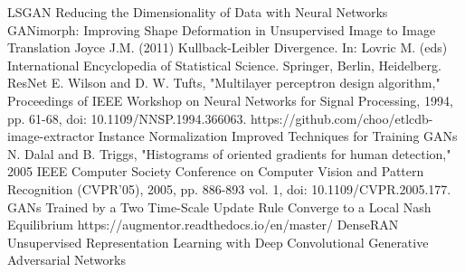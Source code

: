 \documentclass[12pt]{report}
\begin{document}
\begin{thebibliography}{9}
	 LSGAN
	 Reducing the Dimensionality of Data with Neural Networks
	 GANimorph: Improving Shape Deformation in Unsupervised Image to Image Translation
	 Joyce J.M. (2011) Kullback-Leibler Divergence. In: Lovric M. (eds) International Encyclopedia of Statistical Science. Springer, Berlin, Heidelberg.
	 ResNet
	 E. Wilson and D. W. Tufts, "Multilayer perceptron design algorithm," Proceedings of IEEE Workshop on Neural Networks for Signal Processing, 1994, pp. 61-68, doi: 10.1109/NNSP.1994.366063.
	 https://github.com/choo/etlcdb-image-extractor
	 Instance Normalization
	 Improved Techniques for Training GANs
	 N. Dalal and B. Triggs, "Histograms of oriented gradients for human detection," 2005 IEEE Computer Society Conference on Computer Vision and Pattern Recognition (CVPR'05), 2005, pp. 886-893 vol. 1, doi: 10.1109/CVPR.2005.177.
	 GANs Trained by a Two Time-Scale Update Rule Converge to a Local Nash Equilibrium
	 https://augmentor.readthedocs.io/en/master/
	 DenseRAN
	 Unsupervised Representation Learning with Deep Convolutional Generative Adversarial Networks
\end{thebibliography}
\end{document}
